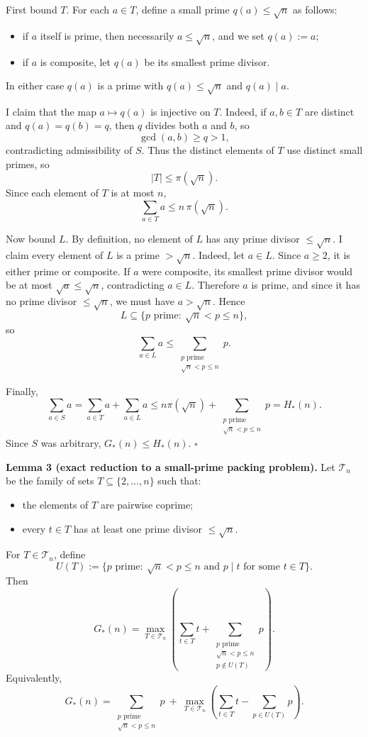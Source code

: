 First bound $T$.
For each $a\in T$, define a small prime $q(a)\le \sqrt n$ as follows:
\begin{itemize}
\item if $a$ itself is prime, then necessarily $a\le \sqrt n$, and we set $q(a):=a$;
\item if $a$ is composite, let $q(a)$ be its smallest prime divisor.
\end{itemize}
In either case $q(a)$ is a prime with $q(a)\le \sqrt n$ and $q(a)\mid a$.

I claim that the map $a\mapsto q(a)$ is injective on $T$.
Indeed, if $a,b\in T$ are distinct and $q(a)=q(b)=q$, then $q$ divides both $a$ and $b$, so
\[
\gcd(a,b)\ge q>1,
\]
contradicting admissibility of $S$.
Thus the distinct elements of $T$ use distinct small primes, so
\[
|T|\le \pi(\sqrt n).
\]
Since each element of $T$ is at most $n$,
\[
\sum_{a\in T}a\le n\,\pi(\sqrt n).
\]

Now bound $L$.
By definition, no element of $L$ has any prime divisor $\le \sqrt n$.
I claim every element of $L$ is a prime $>\sqrt n$.
Indeed, let $a\in L$. Since $a\ge 2$, it is either prime or composite.
If $a$ were composite, its smallest prime divisor would be at most $\sqrt a\le \sqrt n$, contradicting $a\in L$.
Therefore $a$ is prime, and since it has no prime divisor $\le \sqrt n$, we must have $a>\sqrt n$.
Hence
\[
L\subseteq \{p\text{ prime}:\ \sqrt n<p\le n\},
\]
so
\[
\sum_{a\in L}a\le \sum_{\substack{p\text{ prime}\\ \sqrt n<p\le n}}p.
\]

Finally,
\[
\sum_{a\in S}a=\sum_{a\in T}a+\sum_{a\in L}a
\le n\pi(\sqrt n)+\sum_{\substack{p\text{ prime}\\ \sqrt n<p\le n}}p
=H_*(n).
\]
Since $S$ was arbitrary, $G_*(n)\le H_*(n)$.
\hfill$\square$

\medskip
\noindent\textbf{Lemma 3 (exact reduction to a small-prime packing problem).}
Let $\mathcal T_n$ be the family of sets $T\subseteq\{2,\dots,n\}$ such that:
\begin{itemize}
\item the elements of $T$ are pairwise coprime;
\item every $t\in T$ has at least one prime divisor $\le \sqrt n$.
\end{itemize}
For $T\in\mathcal T_n$, define
\[
U(T):=\{p\text{ prime}:\ \sqrt n<p\le n\text{ and }p\mid t\text{ for some }t\in T\}.
\]
Then
\[
G_*(n)=\max_{T\in\mathcal T_n}\left(\sum_{t\in T}t+\sum_{\substack{p\text{ prime}\\ \sqrt n<p\le n\\ p\notin U(T)}}p\right).
\]
Equivalently,
\[
G_*(n)=\sum_{\substack{p\text{ prime}\\ \sqrt n<p\le n}}p
\ +\ \max_{T\in\mathcal T_n}\left(\sum_{t\in T}t-\sum_{p\in U(T)}p\right).
\]

